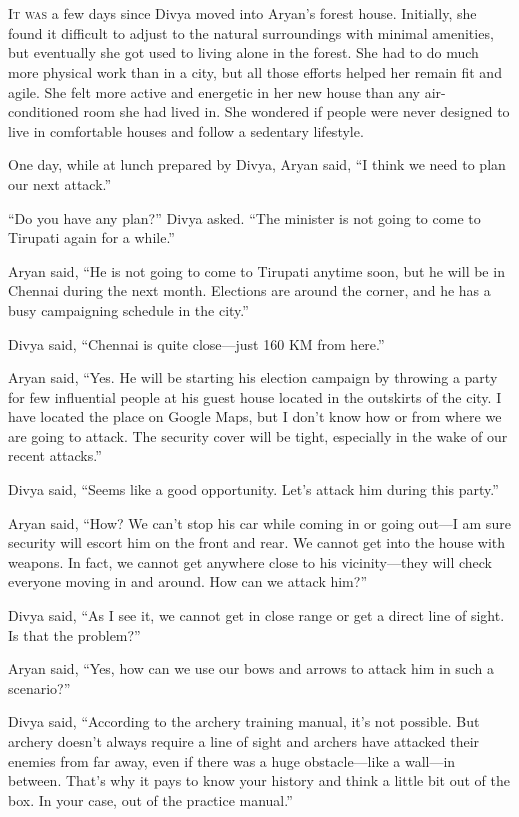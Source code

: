 \chapter{}

\lettrine{I}{t was} a few days since Divya moved into Aryan's forest house. Initially, she
found it difficult to adjust to the natural surroundings with minimal amenities,
but eventually she got used to living alone in the forest. She had to do much
more physical work than in a city, but all those efforts helped her remain fit
and agile. She felt more active and energetic in her new house than any
air-conditioned room she had lived in. She wondered if people were never
designed to
live in comfortable houses and follow a sedentary lifestyle.

One day, while at lunch prepared by Divya, Aryan said, “I think we need to plan
our next attack.”

“Do you have any plan?” Divya asked. “The minister is not going to come to
Tirupati again for a while.”

Aryan said, “He is not going to come to Tirupati anytime soon, but he will be in
Chennai during the next month. Elections are around the corner, and he has a busy
campaigning schedule in the city.”

Divya said, “Chennai is quite close—just 160 KM from here.”

Aryan said, “Yes. He will be starting his election campaign by throwing a party
for few influential people at his guest house located in the outskirts of the
city. I have located the place on Google Maps, but I don't know how or from
where we are going to attack. The security cover will be tight, especially in
the wake of our recent attacks.”

Divya said, “Seems like a good opportunity. Let's attack him during this party.”

Aryan said, “How? We can't stop his car while coming in or going out—I am sure
security will escort him on the front and rear. We cannot get into the house
with weapons. In fact, we cannot get anywhere close to his vicinity—they will
check everyone moving in and around. How can we attack him?”

Divya said, “As I see it, we cannot get in close range or get a direct line of
sight. Is that the problem?”

Aryan said, “Yes, how can we use our bows and arrows to attack him in such a
scenario?”

Divya said, “According to the archery training manual, it's not possible. But
archery doesn't always require a line of sight and archers have attacked their
enemies from far away, even if there was a huge obstacle—like a wall—in
between. That's why it pays to know your history and think a little bit out of
the box. In your case, out of the practice manual.”

